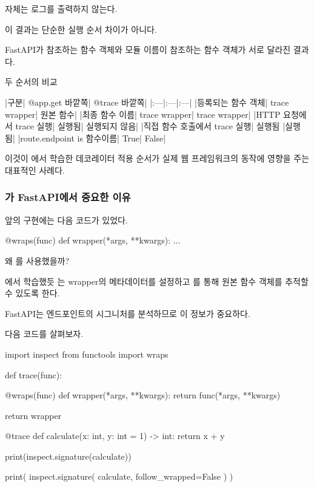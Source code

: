  자체는 로그를 출력하지 않는다.

이 결과는 단순한 실행 순서 차이가 아니다.

FastAPI가 참조하는 함수 객체와 모듈 이름이 참조하는 함수 객체가 서로 달라진 결과다.

\begin{dhknote}
\begin{dhksmry}[centered]
두 순서의 비교
\end{dhksmry}
\end{dhknote}

\begin{dhktable}
|구분|	@app.get 바깥쪽|	@trace 바깥쪽|
|:---|:---|:---|
|등록되는 함수 객체|	trace wrapper|	원본 함수|
|최종 함수 이름|	trace wrapper|	trace wrapper|
|HTTP 요청에서 trace 실행|	실행됨|	실행되지 않음|
|직접 함수 호출에서 trace 실행|	실행됨	|실행됨|
|route.endpoint is 함수이름|	True|	False|
\end{dhktable}

이것이 에서 학습한 데코레이터 적용 순서가 실제 웹 프레임워크의 동작에 영향을 주는 대표적인 사례다.

\subsubsection{가 FastAPI에서 중요한 이유}

앞의  구현에는 다음 코드가 있었다.

\begin{dhkcode}
@wraps(func)
def wrapper(*args, **kwargs):
    ...
\end{dhkcode}

왜 를 사용했을까?

에서 학습했듯 는 wrapper의 메타데이터를 설정하고 를 통해 원본 함수 객체를 추적할 수 있도록 한다.

FastAPI는 엔드포인트의 시그니처를 분석하므로 이 정보가 중요하다.

다음 코드를 살펴보자.

\begin{dhkcode}
import inspect
from functools import wraps


def trace(func):

    @wraps(func)
    def wrapper(*args, **kwargs):
        return func(*args, **kwargs)

    return wrapper


@trace
def calculate(x: int, y: int = 1) -> int:
    return x + y


print(inspect.signature(calculate))

print(
    inspect.signature(
        calculate,
        follow_wrapped=False
    )
)
\end{dhkcode}

